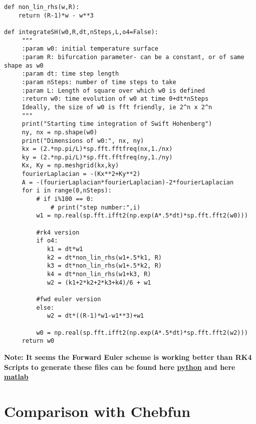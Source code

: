 \documentclass[12pt]{article}
\begin{document}
\begin{verbatim}
def non_lin_rhs(w,R):
    return (R-1)*w - w**3

def integrateSH(w0,R,dt,nSteps,L,o4=False):
     """
     :param w0: initial temperature surface
     :param R: bifurcation parameter- can be a constant, or of same shape as w0
     :param dt: time step length
     :param nSteps: number of time steps to take
     :param L: Length of square over which w0 is defined
     :return w0: time evolution of w0 at time 0+dt*nSteps
     Ideally, the size of w0 is fft friendly, ie 2^n x 2^n
     """
     print("Starting time integration of Swift Hohenberg")
     ny, nx = np.shape(w0)
     print("Dimensions of w0:", nx, ny)
     kx = (2.*np.pi/L)*sp.fft.fftfreq(nx,1./nx)
     ky = (2.*np.pi/L)*sp.fft.fftfreq(ny,1./ny)
     Kx, Ky = np.meshgrid(kx,ky)
     fourierLaplacian = -(Kx**2+Ky**2)
     A = -(fourierLaplacian*fourierLaplacian)-2*fourierLaplacian
     for i in range(0,nSteps):
         # if i%100 == 0:
             # print("step number:",i)
         w1 = np.real(sp.fft.ifft2(np.exp(A*.5*dt)*sp.fft.fft2(w0)))

         #rk4 version
         if o4:
            k1 = dt*w1
            k2 = dt*non_lin_rhs(w1+.5*k1, R)
            k3 = dt*non_lin_rhs(w1+.5*k2, R)
            k4 = dt*non_lin_rhs(w1+k3, R)
            w2 = (k1+2*k2+2*k3+k4)/6 + w1

         #fwd euler version
         else:
            w2 = dt*((R-1)*w1-w1**3)+w1

         w0 = np.real(sp.fft.ifft2(np.exp(A*.5*dt)*sp.fft.fft2(w2)))
     return w0
\end{verbatim}

\textbf{Note: It seems the Forward Euler scheme is working better than RK4}
\textbf{Scripts to generate these files can be found here \href{https://github.com/EMcDugald/convection_patterns/blob/master/code/SH_numerics_notebooks/solve_SH2.ipynb}{python} and here \href{https://github.com/EMcDugald/convection_patterns_matlab/blob/master/tst_cf.m}{matlab}}

\section{Comparison with Chebfun}
\end{document}
